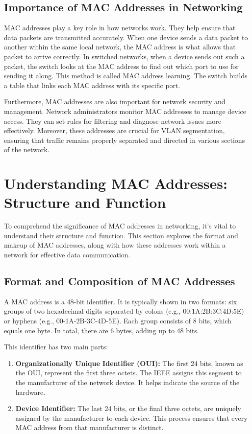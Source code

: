 \documentclass[11pt,a4paper]{article}
\begin{document}
\subsection*{Importance of MAC Addresses in Networking}

MAC addresses play a key role in how networks work. They help ensure that data packets are transmitted accurately. When one device sends a data packet to another within the same local network, the MAC address is what allows that packet to arrive correctly. In switched networks, when a device sends out such a packet, the switch looks at the MAC address to find out which port to use for sending it along. This method is called MAC address learning. The switch builds a table that links each MAC address with its specific port.

Furthermore, MAC addresses are also important for network security and management. Network administrators monitor MAC addresses to manage device access. They can set rules for filtering and diagnose network issues more effectively. Moreover, these addresses are crucial for VLAN segmentation, ensuring that traffic remains properly separated and directed in various sections of the network.


\section*{Understanding MAC Addresses: Structure and Function}
To comprehend the significance of MAC addresses in networking, it’s vital to understand their structure and function. This section explores the format and makeup of MAC addresses, along with how these addresses work within a network for effective data communication.


\subsection*{Format and Composition of MAC Addresses}

A MAC address is a 48-bit identifier. It is typically shown in two formats: six groups of two hexadecimal digits separated by colons (e.g., 00:1A:2B:3C:4D:5E) or hyphens (e.g., 00-1A-2B-3C-4D-5E). Each group consists of 8 bits, which equals one byte. In total, there are 6 bytes, adding up to 48 bits.

This identifier has two main parts:

\begin{enumerate}
    
    \item \textbf{Organizationally Unique Identifier (OUI):} The first 24 bits, known as the OUI, represent the first three octets. The IEEE assigns this segment to the manufacturer of the network device. It helps indicate the source of the hardware.

    \item \textbf{Device Identifier:} The last 24 bits, or the final three octets, are uniquely assigned by the manufacturer to each device. This process ensures that every MAC address from that manufacturer is distinct.

\end{enumerate}
\end{document}
